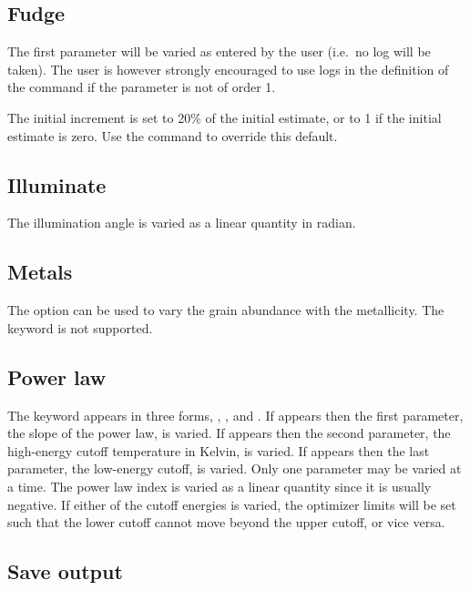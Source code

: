 \subsection{Fudge}

The first parameter will be varied as entered by the user (i.e.\ no log will
be taken). The user is however strongly encouraged to use logs in the
definition of the command if the parameter is not of order 1.

The initial increment is set to 20\% of the initial estimate, or to 1 if the
initial estimate is zero. Use the  command to
override this default.

\subsection{Illuminate}

The illumination angle is varied as a linear quantity in radian.

\subsection{Metals}

The  option can be used to vary the
grain abundance with the metallicity. 
The keyword  is not supported.

\subsection{Power law}

The  keyword appears in three forms,
, , and .
If
 appears then the first parameter,
the slope of the power law, is varied.
If  appears then the second parameter,
the high-energy cutoff temperature in
Kelvin, is varied.
If  appears then the last parameter, the low-energy
cutoff, is varied.
Only one parameter may be varied at a time. The power law index is
varied as a linear quantity since it is usually negative.
If either of the cutoff energies is varied, the optimizer limits
will be set such that the lower cutoff cannot move beyond the upper
cutoff, or vice versa.

\subsection{Save output}

